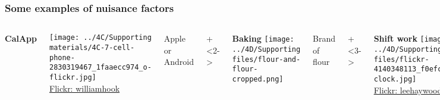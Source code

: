 \begin{frame}\frametitle{Some examples of nuisance factors}
	\begin{columns}[t]
			\textbf{CalApp}
			
			\texttt{[image: ../4C/Supporting materials/4C-7-cell-phone-2830319467\_1faaecc974\_o-flickr.jpg]}
			\\
			{\tiny{\href{https://secure.flickr.com/photos/williamhook/2830319467/}{Flickr: williamhook}}}
			
			\vspace{1cm}
			Apple or Android 
		
		
			\onslide+<2->{
				\textbf{Baking}
				\texttt{[image: ../4D/Supporting files/flour-and-flour-cropped.png]}
		
				\vspace{1.1cm}
				Brand of flour
			}
			
			\onslide+<3->{
				\textbf{Shift work}
				\texttt{[image: ../4D/Supporting files/flickr-4140348113\_f0efc8235b\_z-clock.jpg]}
				\\
				{\tiny{\href{https://secure.flickr.com/photos/leehaywood/4140348113}{Flickr: leehaywood}}}
				
				
				
				\vspace{0.8cm}
				Day shift or night shift
			}
		
			\onslide+<4->{
				\textbf{Gas mileage}
				
				\texttt{[image: ../4C/Supporting materials/4C-6-gas-mileage.png]}
				
				\vspace{1.65cm}
				Driver 1 or driver 2
			}
			
	\end{columns}
			
\end{frame}

